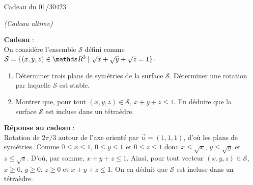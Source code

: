 \documentclass[a4paper]{article}
\begin{document}
	\clearpage
	\centerline{\LARGE Cadeau du 01/30423}
	\centerline{\itshape (Cadeau ultime)}

	\bigskip
	\bigskip
	\bigskip
	\textbf{Cadeau} :\\
	On considère l'ensemble $\mathcal{S}$ défini comme $\mathcal{S} = \{(x,y,z) \in \R^3  \mid \sqrt{x} + \sqrt{y} + \sqrt{z} = 1\}$.
	\begin{enumerate}
		\item Déterminer trois plans de symétries de la surface $\mathcal{S}$.
			Déterminer une rotation par laquelle $\mathcal{S}$ est stable.
		\item Montrer que, pour tout $(x,y,z) \in \mathcal{S}$, $x + y + z \le 1$.
			En déduire que la surface $\mathcal{S}$ est incluse dans un tétraèdre.
	\end{enumerate}

	\bigskip\bigskip
	\textbf{Réponse au cadeau} :\\
	Rotation de $2\pi / 3$ autour de l'axe orienté par $\vec{u} = (1, 1, 1)$, d'où les plans de symétries.
	Comme $0 \le x \le 1$, $0\le y \le 1$ et $0 \le z \le 1$ donc $x \le \sqrt{x}$, $y \le \sqrt{y}$ et $z \le \sqrt{z}$.
	D'où, par somme, $x + y + z \le 1$. Ainsi, pour tout vecteur $(x,y,z) \in \mathcal{S}$, $x \ge 0$, $y \ge 0$, $z \ge 0$ et $x + y + z \le 1$.
	On en déduit que $\mathcal{S}$ est incluse dans un tétraèdre.
\end{document}
